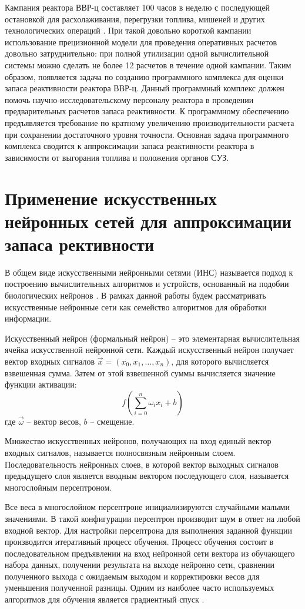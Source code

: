 Кампания реактора ВВР-ц составляет 100 часов в неделю с последующей остановкой для расхолаживания, перегрузки топлива, мишеней и других технологических операций \cite{wwrc-2014}.
При такой довольно короткой кампании использование прецизионной модели для проведения оперативных расчетов довольно затруднительно: при полной утилизации одной вычислительной системы можно сделать не более 12 расчетов в течение одной кампании.
Таким образом, появляется задача по созданию программного комплекса для оценки запаса реактивности реактора ВВР-ц.
Данный программный комплекс должен помочь научно-исследовательскому персоналу реактора в проведении предварительных расчетов запаса реактивности.
К программному обеспечению предъявляется требование по кратному увеличению производительности расчета при сохранении достаточного уровня точности.
Основная задача программного комплекса сводится к аппроксимации запаса реактивности реактора в зависимости от выгорания топлива и положения органов СУЗ.

\section{Применение искусственных нейронных сетей для аппроксимации запаса рективности}

В общем виде искусственными нейронными сетями (ИНС) называется подход к построению вычислительных алгоритмов и устройств, основанный на подобии биологических нейронов \cite{NejronnyeSeti}.
В рамках данной работы будем рассматривать искусственные нейронные сети как семейство алгоритмов для обработки информации.

Искусственный нейрон (формальный нейрон) -- это элементарная
вычислительная ячейка искусственной нейронной сети. Каждый искусственный
нейрон получает вектор входных сигналов $\vec x = (x_0, x_1, \ldots, x_n)$, для которого вычисляется взвешенная сумма.
Затем от этой взвешенной суммы вычисляется значение функции активации:
\begin{equation}
    f(\sum_{i=0}^{n} \omega_i x_i + b)
\end{equation}
где $\vec\omega$ -- вектор весов, $b$ -- смещение.

Множество искусственных нейронов, получающих на вход единый вектор входных сигналов, называется полносвязным нейронным слоем.
Последовательность нейронных слоев, в которой вектор выходных сигналов предыдущего слоя является вводным вектором последующего слоя, называется многослойным персептроном.

Все веса в многослойном персептроне инициализируются случайными малыми
значениями.
В такой конфигурации персептрон производит шум в ответ на любой входной вектор. Для настройки персептрона для выполнения заданной функции производится итеративный процесс обучения.
Процесс обучения состоит в последовательном предъявлении на вход нейронной сети вектора из обучающего набора данных, получении результата на выходе нейронно сети, сравнении полученного выхода с ожидаемым выходом и корректировки весов для уменьшения полученной разницы.
Одним из наиболее часто используемых алгоритмов для обучения является градиентный спуск \cite{neuron-filatova}.


